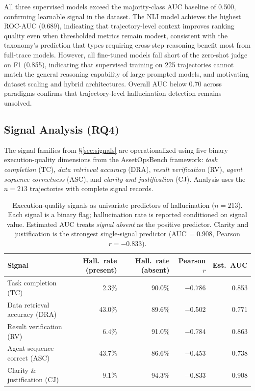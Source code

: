 \documentclass{article}
\begin{document}
All three supervised models exceed the majority-class AUC baseline of 0.500, confirming learnable signal in the dataset. The NLI model achieves the highest ROC-AUC (0.689), indicating that trajectory-level context improves ranking quality even when thresholded metrics remain modest, consistent with the taxonomy's prediction that types requiring cross-step reasoning benefit most from full-trace models. However, all fine-tuned models fall short of the zero-shot judge on F1 (0.855), indicating that supervised training on 225 trajectories cannot match the general reasoning capability of large prompted models, and motivating dataset scaling and hybrid architectures. Overall AUC below 0.70 across paradigms confirms that trajectory-level hallucination detection remains unsolved.

\subsection{Signal Analysis (RQ4)}
\label{sec:signal_results}

The signal families from \S\ref{sec:signals} are operationalized using five binary execution-quality dimensions from the AssetOpsBench framework: \emph{task completion} (TC), \emph{data retrieval accuracy} (DRA), \emph{result verification} (RV), \emph{agent sequence correctness} (ASC), and \emph{clarity and justification} (CJ). Analysis uses the $n = 213$ trajectories with complete signal records.

\begin{table}[t]
\caption{Execution-quality signals as univariate predictors of hallucination ($n = 213$). Each signal is a binary flag; hallucination rate is reported conditioned on signal value. Estimated AUC treats \emph{signal absent} as the positive predictor. Clarity and justification is the strongest single-signal predictor (AUC\,$= 0.908$, Pearson $r = -0.833$).}
\label{tab:signal_analysis}
\centering
\small
\begin{tabular}{lrrrr}
\toprule
\textbf{Signal} & \textbf{Hall.\ rate (present)} & \textbf{Hall.\ rate (absent)} & \textbf{Pearson $r$} & \textbf{Est.\ AUC} \\
\midrule
Task completion (TC)          &  2.3\% & 90.0\% & $-$0.786 & 0.853 \\
Data retrieval accuracy (DRA) & 43.0\% & 89.6\% & $-$0.502 & 0.771 \\
Result verification (RV)      &  6.4\% & 91.0\% & $-$0.784 & 0.863 \\
Agent sequence correct (ASC)  & 43.7\% & 86.6\% & $-$0.453 & 0.738 \\
Clarity \& justification (CJ) &  9.1\% & 94.3\% & $-$0.833 & 0.908 \\
\bottomrule
\end{tabular}
\end{table}
\end{document}
